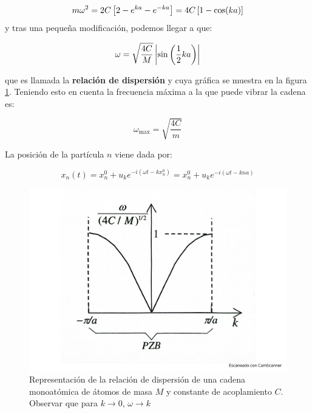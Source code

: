 \begin{equation*}
	m\omega^2 = 2C \left[ 2-e^{ka}-e^{-ka} \right]   = 4C \left[ 1-\cos(ka) \right] 
\end{equation*}
y tras una pequeña modificación, podemos llegar a que:
\begin{mybox}
\begin{equation}
	\omega = \sqrt{\frac{4C}{M}} \left| \sin \left( \frac{1}{2} k a \right) \right| \label{Ec:04-01-10}
\end{equation}
\end{mybox}
que es llamada la \textbf{relación de dispersión} y cuya gráfica se muestra en la figura \ref{Fig:04-02}. Teniendo esto en cuenta la frecuencia máxima a la que puede vibrar la cadena es:

\begin{equation} 
	\omega_{\max} = \sqrt{\frac{4C}{m}} \label{Ec:04-01-11}
\end{equation}

La posición de la partícula $n$ viene dada por:

\begin{equation}
	x_n (t) =x_n^0 + u_k e^{-i(\omega t-k x_n^0)} =x_n^0 + u_k e^{-i(\omega t - kna)}
\end{equation}

\begin{figure}[h!] \centering
	\includegraphics[scale=0.37]{Cuerpo/Ch_04/Fotos libro 2.pdf}
	\caption{Representación de la relación de dispersión de una cadena monoatómica de átomos de masa $M$ y constante de acoplamiento $C$. Observar que para $k\rightarrow 0$, $\omega \rightarrow k$}
	\label{Fig:04-02}
\end{figure}    

